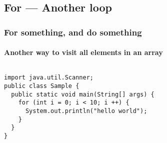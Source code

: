 \documentclass[en, 11pt, xcolor=dvipsnames]{beamer}
\begin{document}
\subsection{For --- Another loop}
\begin{frame}[fragile]
	\frametitle{For something, and do something}
	\framesubtitle{Another way to visit all elements in an array}




	\begin{columns}[c]
		\begin{column}{0.9\textwidth}

			\begin{lstlisting}[style=Java]
import java.util.Scanner;
public class Sample {
  public static void main(String[] args) {
    for (int i = 0; i < 10; i ++) {
      System.out.println("hello world");
    }
  }
}\end{lstlisting}


		\end{column}
	\end{columns}

\end{frame}
\end{document}
